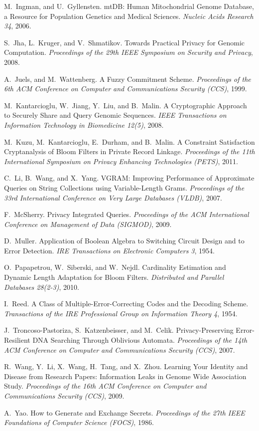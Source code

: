 \documentclass{llncs}
\begin{document}
\begin{thebibliography}{10}
M.~Ingman, and U.~Gyllensten.
mtDB: Human Mitochondrial Genome Database, a Resource for Population Genetics and Medical Sciences.
{\em Nucleic Acids Research 34}, 2006.

S.~Jha, L.~Kruger, and V.~Shmatikov.
Towards Practical Privacy for Genomic Computation.
{\em Proceedings of the 29th IEEE Symposium on Security and Privacy},
2008.

A.~Juels, and M.~Wattenberg.
A Fuzzy Commitment Scheme.
{\em Proceedings of the 6th ACM Conference on Computer and Communications Security (CCS)},
1999.

M.~Kantarcioglu, W.~Jiang, Y.~Liu, and B.~Malin.
A Cryptographic Approach to Securely Share and Query Genomic Sequences.
{\em IEEE Transactions on Information Technology in Biomedicine 12(5)},
2008.

M.~Kuzu, M.~Kantarcioglu, E.~Durham, and B.~Malin.
A Constraint Satisfaction Cryptanalysis of Bloom Filters in Private Record Linkage.
{\em Proceedings of the 11th International Symposium on Privacy Enhancing Technologies (PETS)},
2011.

C.~Li, B.~Wang, and X.~Yang.
VGRAM: Improving Performance of Approximate Queries on String Collections using Variable-Length Grams.
{\em Proceedings of the 33rd International Conference on Very Large Databases (VLDB)}, 2007.

F.~McSherry.
Privacy Integrated Queries.
{\em Proceedings of the ACM International Conference on Management of Data (SIGMOD)},
2009.

D.~Muller.
Application of Boolean Algebra to Switching Circuit Design and to Error Detection. 
{\em IRE Transactions on Electronic Computers 3},
1954.

O.~Papapetrou, W.~Siberski, and W.~Nejdl.
Cardinality Estimation and Dynamic Length Adaptation for Bloom Filters.
{\em Distributed and Parallel Databases 28(2-3)},
2010.

I.~Reed.
A Class of Multiple-Error-Correcting Codes and the Decoding Scheme.
{\em Transactions of the IRE Professional Group on Information Theory 4},
1954.

J.~Troncoso-Pastoriza, S.~Katzenbeisser, and M.~Celik.
Privacy-Preserving Error-Resilient DNA Searching Through Oblivious Automata.
{\em Proceedings of the 14th ACM Conference on Computer and Communications Security (CCS)},
2007.

R.~Wang, Y.~Li, X.~Wang, H.~Tang, and X.~Zhou.
Learning Your Identity and Disease from Research Papers: Information Leaks in Genome Wide Association Study.
{\em Proceedings of the 16th ACM Conference on Computer and Communications Security (CCS)},
2009.



A.~Yao.
How to Generate and Exchange Secrets. 
{\em Proceedings of the 27th IEEE Foundations of Computer Science (FOCS)},
1986.

\end{thebibliography}
\end{document}
